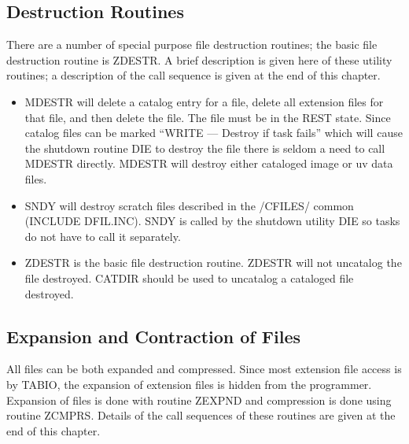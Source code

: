\subsection{Destruction Routines}
There are a number of special purpose file destruction routines; the
basic file destruction routine is ZDESTR.  A brief description is
given here of these utility routines; a description of the call
sequence is given at the end of this chapter.
\begin{itemize} %
\item MDESTR will delete a catalog entry for a file, delete all extension
files for that file, and then delete the file.  The file must be in
the REST state.  Since catalog files can be marked ``WRITE --- Destroy if
task fails'' which will cause the shutdown routine DIE to destroy the
file there is seldom a need to call MDESTR directly.  MDESTR will
destroy either cataloged image or uv data files.
\item SNDY will destroy scratch files described in the /CFILES/ common
(INCLUDE DFIL.INC).
SNDY is called by the shutdown utility DIE so tasks do not have to
call it separately.
\item ZDESTR is the basic file destruction routine.  ZDESTR will not
uncatalog the file destroyed.  CATDIR should be used to uncatalog a
cataloged file destroyed.
\end{itemize} %

\subsection{Expansion and Contraction of Files}
All files can be both expanded and compressed.   Since most
extension file access is by TABIO, the expansion of extension files is
hidden from the programmer. Expansion  of files is done with routine
ZEXPND and compression is done using routine ZCMPRS.  Details of the
call sequences of these routines are given at the end of this chapter.

